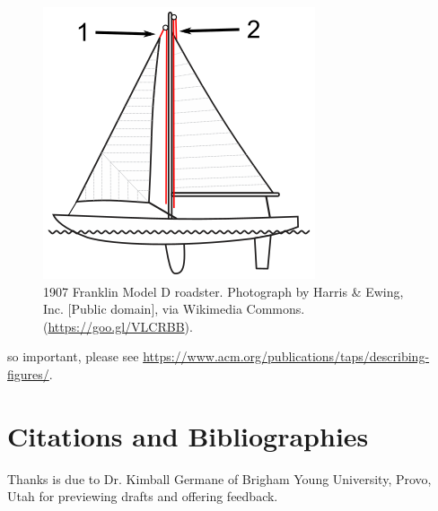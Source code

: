 \documentclass[sigconf]{acmart}
\begin{document}
\begin{figure}[h]
  \centering
  \includegraphics[width=\linewidth]{img/Halyard}
  \caption{1907 Franklin Model D roadster. Photograph by Harris \&
    Ewing, Inc. [Public domain], via Wikimedia
    Commons. (\url{https://goo.gl/VLCRBB}).}
\end{figure}

so important, please see
\url{https://www.acm.org/publications/taps/describing-figures/}.

\section{Citations and Bibliographies}

\begin{acks}
    Thanks is due to Dr. Kimball Germane of Brigham Young University, Provo,
    Utah for previewing drafts and offering feedback.
\end{acks}



\end{document}
